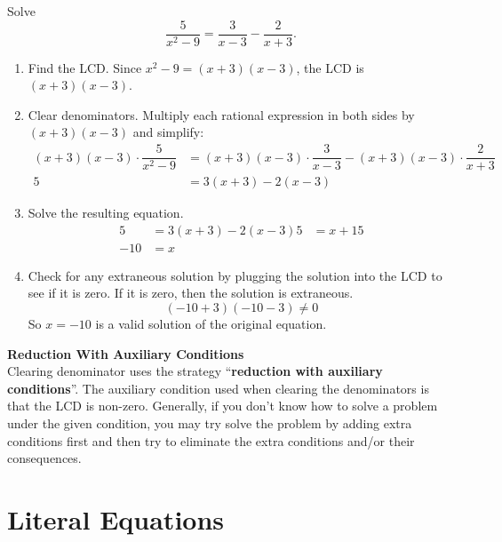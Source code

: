 \documentclass[
  en,11pt]{elegantbook}
\providecommand{\tightlist}{%
  \setlength{\itemsep}{0pt}\setlength{\parskip}{0pt}}
\newcommand{\size}[2]{{\fontsize{#1}{0}\selectfont#2}}
\renewenvironment{example}[1][]{
  \refstepcounter{exam}
  \par\noindent\textbf{\color{main}{\examplename} \theexam #1}
  \rmfamily
}{
  \par\ignorespacesafterend
}
\newenvironment{rmdtip}{
	\vspace*{0.5\baselineskip}
	\par\noindent
	\makebox[-3pt][r]{\color{red!90}\size{12}{\HandRight}\,\,}
    \begin{tcolorbox}[
    enhanced,
    title={\textbf{\color{second}Tips}},
    title style={left color=blue!10!green!20!white,right color=yellow!20!blue!20!white},
    colback=cyan!10!white,
    ]
    \sffamily
}{
    \end{tcolorbox}
    \par\ignorespacesafterend
}
\begin{document}
\begin{example}
Solve
\[
\dfrac{5}{x^2-9}=\dfrac{3}{x-3}-\dfrac{2}{x+3}.
\]
\end{example}

\begin{solution}



\begin{enumerate}
\def\labelenumi{\arabic{enumi}.}
\tightlist
\item
  Find the LCD.
  Since \(x^2-9=(x+3)(x-3)\), the LCD is \((x+3)(x-3)\).
\item
  Clear denominators.
  Multiply each rational expression in both sides by \((x+3)(x-3)\) and simplify:
  \[
       \begin{aligned}
           (x+3)(x-3)\cdot\dfrac{5}{x^2-9}&=(x+3)(x-3)\cdot\dfrac{3}{x-3}-(x+3)(x-3)\cdot\dfrac{2}{x+3}\\
           5&=3(x+3)-2(x-3)
       \end{aligned}
   \]
\item
  Solve the resulting equation.
  \[
       \begin{aligned}
           5&=3(x+3)-2(x-3)
           5&=x+15\\
           -10&=x
       \end{aligned}
   \]
\item
  Check for any extraneous solution by plugging the solution into the LCD to see if it is zero. If it is zero, then the solution is extraneous.
  \[
       (-10+3)(-10-3)\neq 0
   \]
  So \(x=-10\) is a valid solution of the original equation.
\end{enumerate}

\end{solution}

\begin{rmdtip}

\textbf{Reduction With Auxiliary Conditions}\\
Clearing denominator uses the strategy ``\textbf{reduction with auxiliary conditions}''. The auxiliary condition used when clearing the denominators is that the LCD is non-zero. Generally, if you don't know how to solve a problem under the given condition, you may try solve the problem by adding extra conditions first and then try to eliminate the extra conditions and/or their consequences.

\end{rmdtip}

\hypertarget{literal-equations}{%
\section{Literal Equations}\label{literal-equations}}
\end{document}
